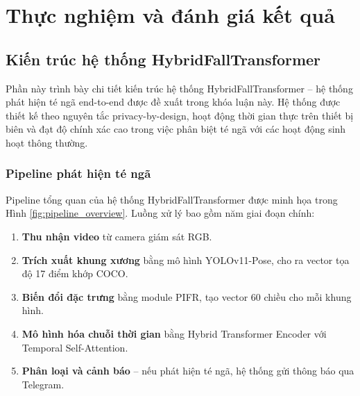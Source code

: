 \chapter{Thực nghiệm và đánh giá kết quả}
\label{chap:experiments}

\section{Kiến trúc hệ thống HybridFallTransformer}
\label{sec:proposed_system}

Phần này trình bày chi tiết kiến trúc hệ thống HybridFallTransformer -- hệ thống phát hiện té ngã end-to-end được đề xuất trong khóa luận này. Hệ thống được thiết kế theo nguyên tắc privacy-by-design, hoạt động thời gian thực trên thiết bị biên và đạt độ chính xác cao trong việc phân biệt té ngã với các hoạt động sinh hoạt thông thường.

\subsection{Pipeline phát hiện té ngã}
\label{sec:pipeline_overview}

Pipeline tổng quan của hệ thống HybridFallTransformer được minh họa trong Hình \ref{fig:pipeline_overview}. Luồng xử lý bao gồm năm giai đoạn chính:

\begin{enumerate}
    \item \textbf{Thu nhận video} từ camera giám sát RGB.
    \item \textbf{Trích xuất khung xương} bằng mô hình YOLOv11-Pose, cho ra vector tọa độ 17 điểm khớp COCO.
    \item \textbf{Biến đổi đặc trưng} bằng module PIFR, tạo vector 60 chiều cho mỗi khung hình.
    \item \textbf{Mô hình hóa chuỗi thời gian} bằng Hybrid Transformer Encoder với Temporal Self-Attention.
    \item \textbf{Phân loại và cảnh báo} -- nếu phát hiện té ngã, hệ thống gửi thông báo qua Telegram.
\end{enumerate}


